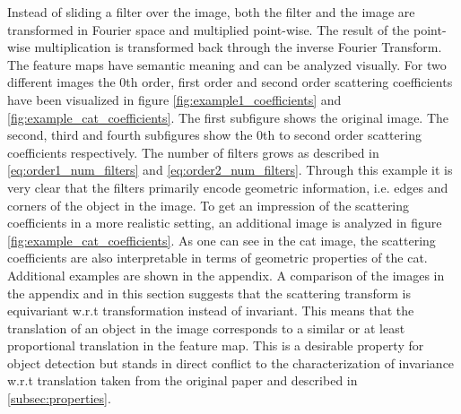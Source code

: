 Instead of sliding a filter over the image, both the filter and the image are transformed in Fourier space and multiplied point-wise. The result of the point-wise multiplication is transformed back through the inverse Fourier Transform. The feature maps have semantic meaning and can be analyzed visually. For two different images the 0th order, first order and second order scattering coefficients have been visualized in figure \ref{fig:example1_coefficients} and \ref{fig:example_cat_coefficients}. The first subfigure shows the original image. The second, third and fourth subfigures show the 0th to second order scattering coefficients respectively. The number of filters grows as described in \ref{eq:order1_num_filters} and \ref{eq:order2_num_filters}. Through this example it is very clear that the filters primarily encode geometric information, i.e. edges and corners of the object in the image. To get an  impression of the scattering coefficients in a more realistic setting, an additional image is analyzed in figure \ref{fig:example_cat_coefficients}. As one can see in the cat image, the scattering coefficients are also interpretable in terms of geometric properties of the cat. Additional examples are shown in the appendix. A comparison of the images in the appendix and in this section suggests that the scattering transform is equivariant w.r.t transformation instead of invariant. This means that the translation of an object in the image corresponds to a similar or at least proportional translation in the feature map. This is a desirable property for object detection but stands in direct conflict to the characterization of invariance w.r.t translation taken from the original paper and described in \ref{subsec:properties}. 

\fboxsep=0mm%
\fboxrule=1pt%

